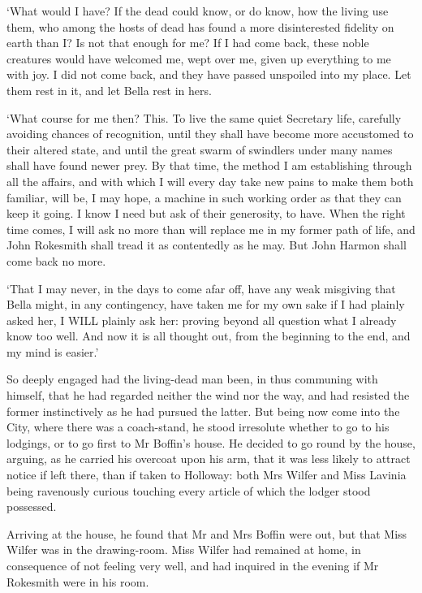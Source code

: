 ‘What would I have? If the dead could know, or do know, how the living
use them, who among the hosts of dead has found a more disinterested
fidelity on earth than I? Is not that enough for me? If I had come back,
these noble creatures would have welcomed me, wept over me, given up
everything to me with joy. I did not come back, and they have passed
unspoiled into my place. Let them rest in it, and let Bella rest in
hers.

‘What course for me then? This. To live the same quiet Secretary life,
carefully avoiding chances of recognition, until they shall have become
more accustomed to their altered state, and until the great swarm of
swindlers under many names shall have found newer prey. By that time,
the method I am establishing through all the affairs, and with which I
will every day take new pains to make them both familiar, will be, I may
hope, a machine in such working order as that they can keep it going.
I know I need but ask of their generosity, to have. When the right time
comes, I will ask no more than will replace me in my former path of
life, and John Rokesmith shall tread it as contentedly as he may. But
John Harmon shall come back no more.

‘That I may never, in the days to come afar off, have any weak misgiving
that Bella might, in any contingency, have taken me for my own sake if
I had plainly asked her, I WILL plainly ask her: proving beyond all
question what I already know too well. And now it is all thought out,
from the beginning to the end, and my mind is easier.’


So deeply engaged had the living-dead man been, in thus communing with
himself, that he had regarded neither the wind nor the way, and had
resisted the former instinctively as he had pursued the latter. But
being now come into the City, where there was a coach-stand, he stood
irresolute whether to go to his lodgings, or to go first to Mr Boffin’s
house. He decided to go round by the house, arguing, as he carried his
overcoat upon his arm, that it was less likely to attract notice if left
there, than if taken to Holloway: both Mrs Wilfer and Miss Lavinia being
ravenously curious touching every article of which the lodger stood
possessed.

Arriving at the house, he found that Mr and Mrs Boffin were out, but
that Miss Wilfer was in the drawing-room. Miss Wilfer had remained at
home, in consequence of not feeling very well, and had inquired in the
evening if Mr Rokesmith were in his room.

